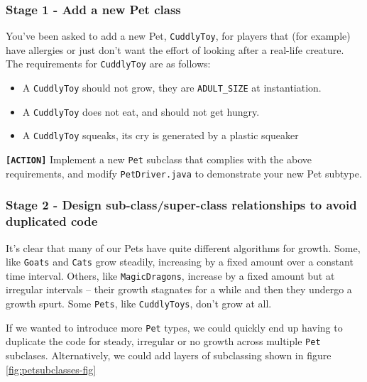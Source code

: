 \documentclass[
]{book}
\providecommand{\tightlist}{%
  \setlength{\itemsep}{0pt}\setlength{\parskip}{0pt}}
\begin{document}
\hypertarget{pet}{%
\subsubsection{Stage 1 - Add a new Pet class}\label{pet}}

You've been asked to add a new Pet, \texttt{CuddlyToy}, for players that (for example) have allergies or just don't want the effort of looking after a real-life creature. The requirements for \texttt{CuddlyToy} are as follows:

\begin{itemize}
\tightlist
\item
  A \texttt{CuddlyToy} should not grow, they are \texttt{ADULT\_SIZE} at instantiation.
\item
  A \texttt{CuddlyToy} does not eat, and should not get hungry.
\item
  A \texttt{CuddlyToy} squeaks, its cry is generated by a plastic squeaker
\end{itemize}

\textbf{\texttt{{[}ACTION{]}}} Implement a new \texttt{Pet} subclass that complies with the above requirements, and modify \texttt{PetDriver.java} to demonstrate your new Pet subtype.

\hypertarget{stage-2---design-sub-classsuper-class-relationships-to-avoid-duplicated-code}{%
\subsubsection{Stage 2 - Design sub-class/super-class relationships to avoid duplicated code}\label{stage-2---design-sub-classsuper-class-relationships-to-avoid-duplicated-code}}

It's clear that many of our Pets have quite different algorithms for growth. Some, like \texttt{Goats} and \texttt{Cats} grow steadily, increasing by a fixed amount over a constant time interval. Others, like \texttt{MagicDragons}, increase by a fixed amount but at irregular intervals -- their growth stagnates for a while and then they undergo a growth spurt. Some \texttt{Pets}, like \texttt{CuddlyToys}, don't grow at all.

If we wanted to introduce more \texttt{Pet} types, we could quickly end up having to duplicate the code for steady, irregular or no growth across multiple \texttt{Pet} subclases. Alternatively, we could add layers of subclassing shown in figure \ref{fig:petsubclasses-fig}
\end{document}
